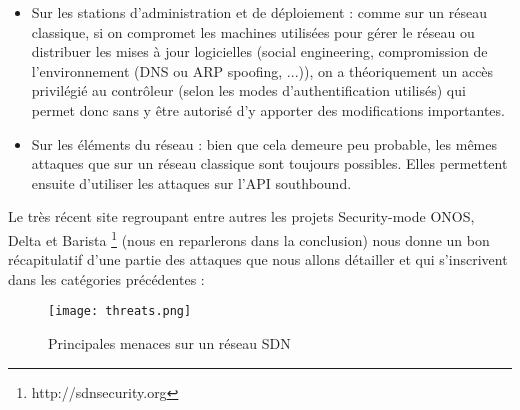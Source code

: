 \begin{itemize}
\item Sur les stations d'administration et de déploiement : comme sur un réseau classique, si on compromet les machines utilisées pour gérer le réseau ou distribuer les mises à jour logicielles (social engineering, compromission de l'environnement (DNS ou ARP spoofing, ...)), on a théoriquement un accès privilégié au contrôleur (selon les modes d'authentification utilisés) qui permet donc sans y être autorisé d'y apporter des modifications importantes.\\

\item Sur les éléments du réseau : bien que cela demeure peu probable, les mêmes attaques que sur un réseau classique sont toujours possibles. Elles permettent ensuite d'utiliser les attaques sur l'API southbound.

\end{itemize}

Le très récent site regroupant entre autres les projets Security-mode ONOS, Delta et Barista \footnote{http://sdnsecurity.org} (nous en reparlerons dans la conclusion) nous donne un bon récapitulatif d'une partie des attaques que nous allons détailler et qui s'inscrivent dans les catégories précédentes :
\begin{figure}[h]
  	\centering
  	\texttt{[image: threats.png]}
  	\caption{Principales menaces sur un réseau SDN}
\end{figure}

